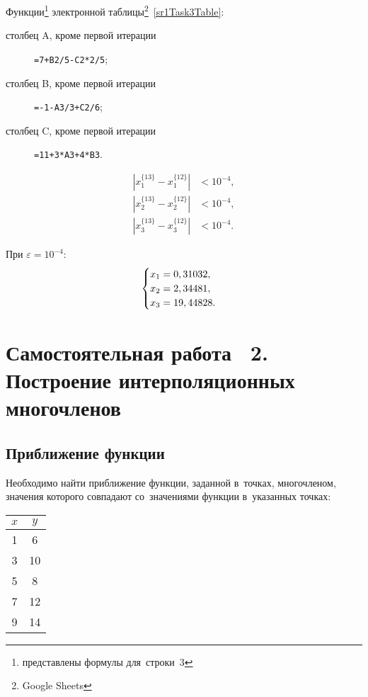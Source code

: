 \documentclass[10pt, a4paper, titlepage, oneside]{article}
\begin{document}
Функции\footnote{представлены формулы для~строки~3} электронной таблицы\footnote{Google Sheets}~\ref{sr1Task3Table}:
\begin{description}
    \item[столбец A, кроме первой итерации] \verb"=7+B2/5-C2*2/5";
    
    \item[столбец B, кроме первой итерации]  \verb"=-1-A3/3+C2/6";
    
    \item[столбец C, кроме первой итерации] \verb"=11+3*A3+4*B3".
    
\end{description}

\begin{align*}
    \left|x_1^{\{13\}}-x_1^{\{12\}}\right| &< 10^{-4}, \\
    \left|x_2^{\{13\}}-x_2^{\{12\}}\right| &< 10^{-4}, \\
    \left|x_3^{\{13\}}-x_3^{\{12\}}\right| &< 10^{-4}.
\end{align*}

При $\varepsilon=10^{-4}$:
\begin{equation*}
    \begin{cases}
        $$x_1=0,31032$$, \\
        $$x_2=2,34481$$, \\
        $$x_3=19,44828$$.
    \end{cases}
\end{equation*}

\clearpage
\section{Самостоятельная работа \textnumero~2. Построение интерполяционных многочленов}

\subsection*{Приближение функции}

Необходимо найти приближение функции, заданной в~точках, многочленом, значения которого совпадают со~значениями функции в~указанных точках:

\begin{center}
	\begin{tabular}{*{2}{S[table-alignment-mode=none]}}
		\toprule
		
		$x$ & $y$ \\
		
		\midrule
		
		1 & 6 \\
		3 & 10 \\
		5 & 8 \\
		7 & 12 \\
		9 & 14 \\
		
		\bottomrule
	\end{tabular}
\end{center}
\end{document}
